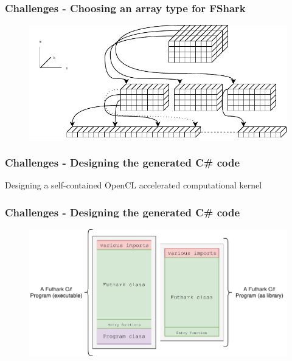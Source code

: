 \documentclass[10pt, compress, usenames, dvipsnames]{beamer}
\begin{document}
\begin{frame}[fragile]
  \frametitle{Challenges - Choosing an array type for FShark}
  \begin{figure}
    \includegraphics[scale=0.75]{./images/jaggedtoflat}
  \end{figure}
\end{frame}

\begin{frame}[fragile]
  \frametitle{Challenges - Designing the generated C\# code}
\begin{center}
  {\Huge Designing a self-contained OpenCL accelerated computational kernel}
\end{center}
\end{frame}

\begin{frame}[fragile]
  \frametitle{Challenges - Designing the generated C\# code}
  \begin{figure}
    \centering
    \includegraphics[scale=0.75]{./images/futharkcs_wide}
  \end{figure}
\end{frame}
\end{document}
